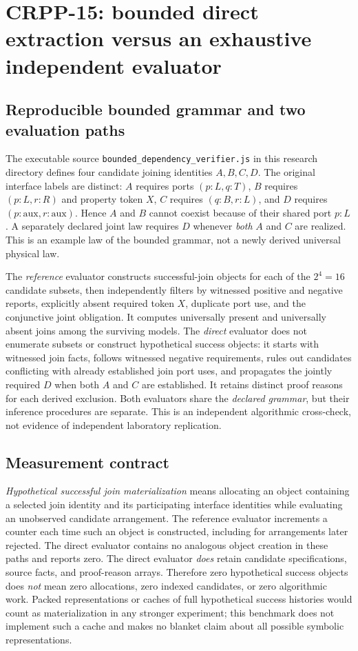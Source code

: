 \documentclass[11pt]{article}
\begin{document}
\section{CRPP-15: bounded direct extraction versus an exhaustive independent evaluator}
\label{sec:crpp15}

\subsection{Reproducible bounded grammar and two evaluation paths}
The executable source \texttt{bounded\_dependency\_verifier.js}
in this research directory defines four candidate joining
identities $A,B,C,D$. The original interface labels are
distinct: $A$ requires ports $(p{:}L,q{:}T)$,
$B$ requires $(p{:}L,r{:}R)$ and property token $X$,
$C$ requires $(q{:}B,r{:}L)$, and
$D$ requires $(p{:}\mathrm{aux},r{:}\mathrm{aux})$.
Hence $A$ and $B$ cannot coexist because of their
shared port $p{:}L$. A separately declared joint law
requires $D$ whenever \emph{both} $A$ and $C$ are
realized. This is an example law of the bounded
grammar, not a newly derived universal physical law.

The \emph{reference} evaluator constructs successful-join
objects for each of the $2^4=16$ candidate subsets,
then independently filters by witnessed positive and
negative reports, explicitly absent required token
$X$, duplicate port use, and the conjunctive joint
obligation. It computes universally present and
universally absent joins among the surviving models.
The \emph{direct} evaluator does not enumerate subsets
or construct hypothetical success objects: it starts
with witnessed join facts, follows witnessed negative
requirements, rules out candidates conflicting with
already established join port uses, and propagates
the jointly required $D$ when both $A$ and $C$ are
established. It retains distinct proof reasons for
each derived exclusion. Both evaluators share the
\emph{declared grammar}, but their inference procedures
are separate. This is an independent algorithmic
cross-check, not evidence of independent laboratory
replication.

\subsection{Measurement contract}
\emph{Hypothetical successful join materialization}
means allocating an object containing a selected join
identity and its participating interface identities
while evaluating an unobserved candidate arrangement.
The reference evaluator increments a counter each
time such an object is constructed, including for
arrangements later rejected. The direct evaluator
contains no analogous object creation in these paths
and reports zero. The direct evaluator \emph{does}
retain candidate specifications, source facts, and
proof-reason arrays. Therefore zero hypothetical
success objects does \emph{not} mean zero allocations,
zero indexed candidates, or zero algorithmic work.
Packed representations or caches of full hypothetical
success histories would count as materialization in
any stronger experiment; this benchmark does not
implement such a cache and makes no blanket claim
about all possible symbolic representations.
\end{document}
